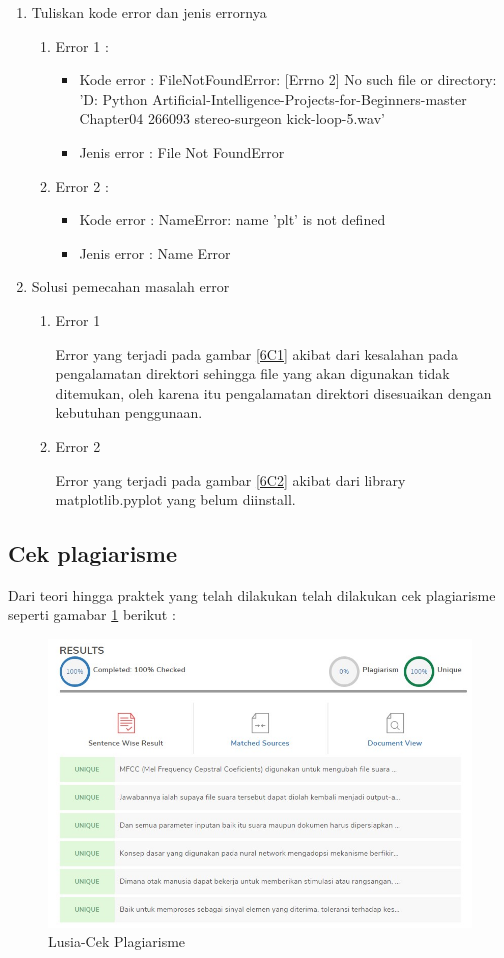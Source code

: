 \begin{enumerate}
	\item Tuliskan kode error dan jenis errornya
		\begin{enumerate}
		\item Error 1 :
			\begin{itemize}
				\item Kode error : FileNotFoundError: [Errno 2] No such file or directory: 'D: Python Artificial-Intelligence-Projects-for-Beginners-master  Chapter04 266093 stereo-surgeon kick-loop-5.wav'
				\item Jenis error : File Not FoundError
			\end{itemize}
		\item Error 2 :
			\begin{itemize}
				\item Kode error : NameError: name 'plt' is not defined
				\item Jenis error : Name Error
			\end{itemize}
		\end{enumerate}
	\item Solusi pemecahan masalah error
	\begin{enumerate}
	\item Error 1
		\par Error yang terjadi pada gambar \ref{6C1} akibat dari kesalahan pada pengalamatan direktori sehingga file yang akan digunakan tidak ditemukan, oleh karena itu pengalamatan direktori disesuaikan dengan kebutuhan penggunaan.
	\item Error 2
		\par Error yang terjadi pada gambar \ref{6C2} akibat dari library matplotlib.pyplot yang belum diinstall.
	\end{enumerate}
		
\end{enumerate}

\subsection{Cek plagiarisme}
Dari teori hingga praktek yang telah dilakukan telah dilakukan cek plagiarisme seperti gamabar \ref{6D1}  berikut :
			\begin{figure}[!hbtp]
			\centering
			\includegraphics[scale=0.5]{figures/pc5.jpg}
			\caption{Lusia-Cek Plagiarisme}
			\label{6D1}
			\end{figure}